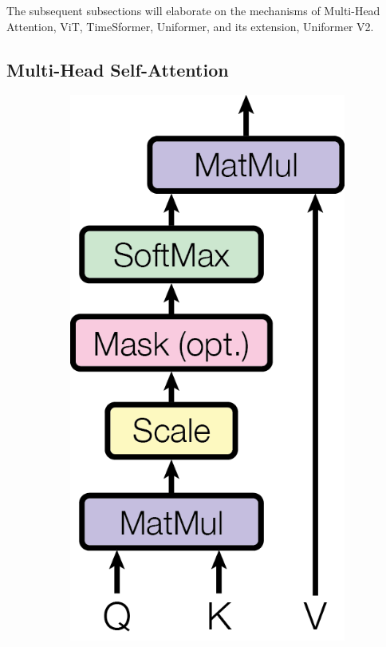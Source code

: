 The subsequent subsections will elaborate on the mechanisms of Multi-Head Attention, ViT, TimeSformer, Uniformer, and its extension, Uniformer V2.


\subsection{Multi-Head Self-Attention}

\begin{figure}
    \centering
    \begin{subfigure}[b]{0.2\textwidth}
        \centering
        \includegraphics[width=\textwidth]{assets/charts_rw/Transformer_Attention.png}

\end{subfigure}
\end{figure}
